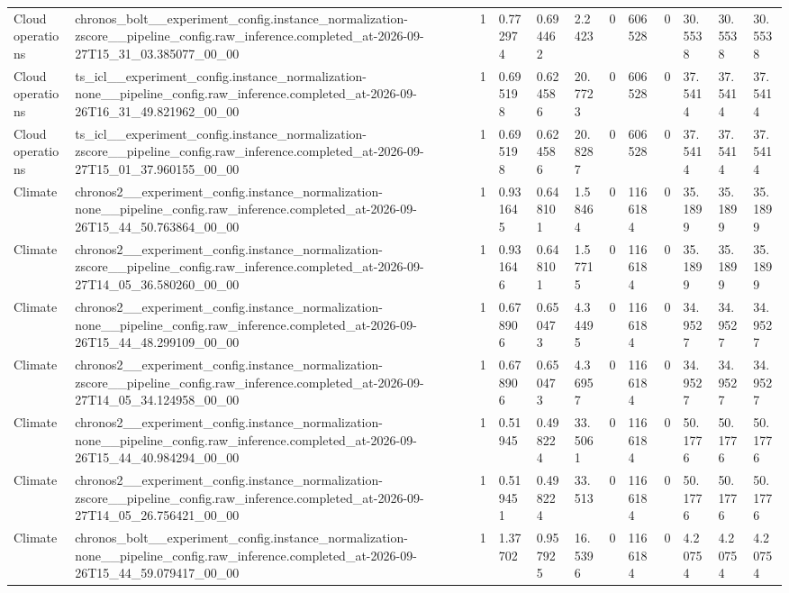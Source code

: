 \begin{tabular}{llllllllllll}
Cloud operations & chronos\_bolt\_\_experiment\_config.instance\_normalization-zscore\_\_pipeline\_config.raw\_inference.completed\_at-2026-09-27T15\_31\_03.385077\_00\_00 & 1 & 0.772974 & 0.694462 & 2.2423 & 0 & 606528 & 0 & 30.5538 & 30.5538 & 30.5538 \\
Cloud operations & ts\_icl\_\_experiment\_config.instance\_normalization-none\_\_pipeline\_config.raw\_inference.completed\_at-2026-09-26T16\_31\_49.821962\_00\_00 & 1 & 0.695198 & 0.624586 & 20.7723 & 0 & 606528 & 0 & 37.5414 & 37.5414 & 37.5414 \\
Cloud operations & ts\_icl\_\_experiment\_config.instance\_normalization-zscore\_\_pipeline\_config.raw\_inference.completed\_at-2026-09-27T15\_01\_37.960155\_00\_00 & 1 & 0.695198 & 0.624586 & 20.8287 & 0 & 606528 & 0 & 37.5414 & 37.5414 & 37.5414 \\
Climate & chronos2\_\_experiment\_config.instance\_normalization-none\_\_pipeline\_config.raw\_inference.completed\_at-2026-09-26T15\_44\_50.763864\_00\_00 & 1 & 0.931645 & 0.648101 & 1.58464 & 0 & 1166184 & 0 & 35.1899 & 35.1899 & 35.1899 \\
Climate & chronos2\_\_experiment\_config.instance\_normalization-zscore\_\_pipeline\_config.raw\_inference.completed\_at-2026-09-27T14\_05\_36.580260\_00\_00 & 1 & 0.931646 & 0.648101 & 1.57715 & 0 & 1166184 & 0 & 35.1899 & 35.1899 & 35.1899 \\
Climate & chronos2\_\_experiment\_config.instance\_normalization-none\_\_pipeline\_config.raw\_inference.completed\_at-2026-09-26T15\_44\_48.299109\_00\_00 & 1 & 0.678906 & 0.650473 & 4.34495 & 0 & 1166184 & 0 & 34.9527 & 34.9527 & 34.9527 \\
Climate & chronos2\_\_experiment\_config.instance\_normalization-zscore\_\_pipeline\_config.raw\_inference.completed\_at-2026-09-27T14\_05\_34.124958\_00\_00 & 1 & 0.678906 & 0.650473 & 4.36957 & 0 & 1166184 & 0 & 34.9527 & 34.9527 & 34.9527 \\
Climate & chronos2\_\_experiment\_config.instance\_normalization-none\_\_pipeline\_config.raw\_inference.completed\_at-2026-09-26T15\_44\_40.984294\_00\_00 & 1 & 0.51945 & 0.498224 & 33.5061 & 0 & 1166184 & 0 & 50.1776 & 50.1776 & 50.1776 \\
Climate & chronos2\_\_experiment\_config.instance\_normalization-zscore\_\_pipeline\_config.raw\_inference.completed\_at-2026-09-27T14\_05\_26.756421\_00\_00 & 1 & 0.519451 & 0.498224 & 33.513 & 0 & 1166184 & 0 & 50.1776 & 50.1776 & 50.1776 \\
Climate & chronos\_bolt\_\_experiment\_config.instance\_normalization-none\_\_pipeline\_config.raw\_inference.completed\_at-2026-09-26T15\_44\_59.079417\_00\_00 & 1 & 1.37702 & 0.957925 & 16.5396 & 0 & 1166184 & 0 & 4.20754 & 4.20754 & 4.20754 \\

\end{tabular}
